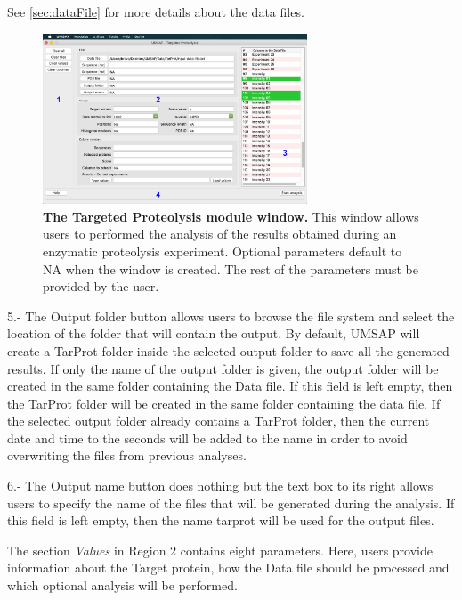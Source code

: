 See \autoref{sec:dataFile} for more details about the data files.

\begin{figure}[h]
	\centering
	\includegraphics[width=0.7\textwidth]{./IMAGES/MOD-TARPROT/tarprot-mod.jpg}
	\caption[The Targeted Proteolysis module window]{\textbf{The Targeted Proteolysis module window.} This window allows users to performed the analysis of the results obtained during an enzymatic proteolysis experiment. Optional parameters default to NA when the window is created. The rest of the parameters must be provided by the user.} 
	\label{fig:tarprotMainWindow}
	\vspace{-5pt} 	
\end{figure} 

\num{5}.- The Output folder\label{par:tarprotOutFolder} button allows users to browse the file system and select the location of the folder that will contain the output. By default, UMSAP will create a TarProt folder inside the selected output folder to save all the generated results. If only the name of the output folder is given, the output folder will be created in the same folder containing the Data file. If this field is left empty, then the TarProt folder will be created in the same folder containing the data file. If the selected output folder already contains a TarProt folder, then the current date and time to the seconds will be added to the name in order to avoid overwriting the files from previous analyses.

\num{6}.- The Output name button does nothing but the text box to its right allows users to specify the name of the files that will be generated during the analysis. If this field is left empty, then the name tarprot will be used for the output files. 

The section \textit{Values} in Region \num{2} contains eight parameters. Here, users provide information about the Target protein, how the Data file should be processed and which optional analysis will be performed.

